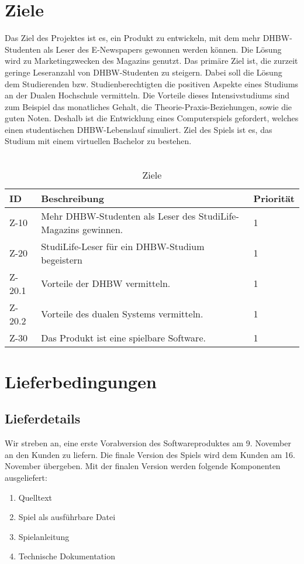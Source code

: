 \chapter{Ziele}
Das Ziel des Projektes ist es, ein Produkt zu entwickeln, mit dem mehr DHBW-Studenten als Leser des E-Newspapers gewonnen werden können. Die Lösung wird zu Marketingzwecken  des Magazins genutzt. Das primäre Ziel ist, die zurzeit geringe Leseranzahl von DHBW-Studenten zu steigern. Dabei soll die Lösung dem Studierenden bzw. Studienberechtigten die positiven Aspekte eines Studiums an der Dualen Hochschule vermitteln. Die Vorteile dieses Intensivstudiums sind zum Beispiel das monatliches Gehalt, die Theorie-Praxis-Beziehungen, sowie die guten Noten. Deshalb ist die Entwicklung eines Computerspiels gefordert, welches einen studentischen DHBW-Lebenslauf simuliert. Ziel des Spiels ist es, das Studium mit einem virtuellen Bachelor zu bestehen. \\\\

\begin{table}[H]
\caption{Ziele}
\label{ziele:entwicklungsziele}
\begin{tabularx}{\textwidth}{|l|X|l|}
\toprule
\textbf{ID} & \textbf{Beschreibung} & \textbf{Priorität}\\
\endhead
\hline
Z-10 & Mehr DHBW-Studenten als Leser des StudiLife-Magazins gewinnen. & 1 \\
Z-20 & StudiLife-Leser für ein DHBW-Studium begeistern & 1 \\
Z-20.1 & Vorteile der DHBW vermitteln. & 1 \\
Z-20.2 & Vorteile des dualen Systems vermitteln. & 1 \\
Z-30 & Das Produkt ist eine spielbare Software. & 1\\
\hline
\end{tabularx}
\end{table}

\chapter{Lieferbedingungen}
\section{Lieferdetails}
Wir streben an, eine erste Vorabversion des Softwareproduktes am 9. November an den Kunden zu liefern. Die finale Version des Spiels wird dem Kunden am 16. November übergeben.
Mit der finalen Version werden folgende Komponenten ausgeliefert:
\begin{enumerate}
	\item Quelltext
	\item Spiel als ausführbare Datei
	\item Spielanleitung
	\item Technische Dokumentation
	
\end{enumerate}


